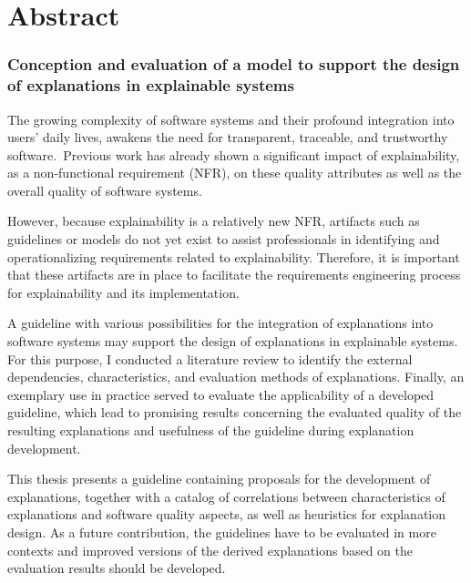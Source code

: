 \clearpage

\chapter*{Abstract}

\subsection*{Conception and evaluation of a model to support the design of explanations in explainable systems}

The growing complexity of software systems and their profound integration into users’ daily lives, awakens the need for transparent, traceable, and trustworthy software. Previous work  has already shown a significant impact of explainability, as a non-functional requirement (NFR), on these quality attributes as well as the overall quality of software systems.

However, because explainability is a relatively new NFR, artifacts such as guidelines or models do not yet exist to assist professionals in identifying and operationalizing requirements related to explainability. Therefore, it is important that these artifacts are in place to facilitate the requirements engineering process for explainability and its implementation.

A guideline with various possibilities for the integration of explanations into software systems may support the design of explanations in explainable systems. For this purpose, I conducted a literature review to identify the external dependencies, characteristics, and evaluation methods of explanations. Finally, an exemplary use in practice served to evaluate the applicability of a developed guideline, which lead to promising results concerning the evaluated quality of the resulting explanations and usefulness of the guideline during explanation development.

This thesis presents a guideline containing proposals for the development of explanations, together with a catalog of correlations between characteristics of explanations and software quality aspects, as well as heuristics for explanation design. As a future contribution, the guidelines have to be evaluated in more contexts and improved versions of the derived explanations based on the evaluation results should be developed.

\clearpage